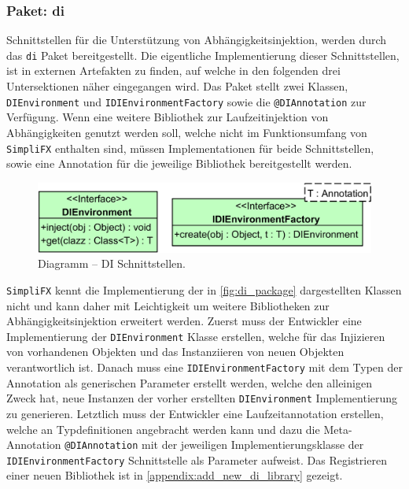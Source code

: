 \subsubsection{Paket: di}
Schnittstellen für die Unterstützung von Abhängigkeitsinjektion, werden durch das \texttt{di} Paket bereitgestellt. Die eigentliche Implementierung dieser Schnittstellen, ist in externen  Artefakten zu finden, auf welche in den folgenden drei Untersektionen näher eingegangen wird.
Das Paket stellt zwei Klassen, \texttt{DIEnvironment} und \texttt{IDIEnvironmentFactory} sowie die \texttt{@DIAnnotation} zur Verfügung. Wenn eine weitere Bibliothek zur Laufzeitinjektion von Abhängigkeiten genutzt werden soll, welche nicht im Funktionsumfang von \texttt{SimpliFX} enthalten sind, müssen Implementationen für beide Schnittstellen, sowie eine Annotation für die jeweilige Bibliothek bereitgestellt werden.
\begin{figure}[H]
	\centering
	\includegraphics[width=\textwidth-2cm]{Abbildungen/DI Paket.png}
	\caption{Diagramm -- DI Schnittstellen.}
	\label{fig:di_package}
\end{figure}
\noindent \texttt{SimpliFX} kennt die Implementierung der in \autoref{fig:di_package} dargestellten Klassen nicht und kann daher mit Leichtigkeit um weitere Bibliotheken zur Abhängigkeitsinjektion erweitert werden. Zuerst muss der Entwickler eine Implementierung der \texttt{DIEnvironment} Klasse erstellen, welche für das Injizieren von vorhandenen Objekten und das Instanziieren von neuen Objekten verantwortlich ist. Danach muss eine \texttt{IDIEnvironmentFactory} mit dem Typen der Annotation als generischen Parameter erstellt werden, welche den alleinigen Zweck hat, neue Instanzen der vorher erstellten \texttt{DIEnvironment} Implementierung zu generieren. Letztlich muss der Entwickler eine Laufzeitannotation erstellen, welche an Typdefinitionen angebracht werden kann und dazu die Meta-Annotation \texttt{@DIAnnotation} mit der jeweiligen Implementierungsklasse der \texttt{IDIEnvironmentFactory} Schnittstelle als Parameter aufweist. Das Registrieren einer neuen Bibliothek ist in \autoref{appendix:add_new_di_library} gezeigt.
